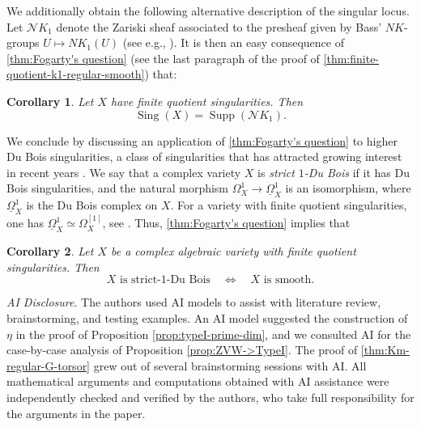 \documentclass{amsart}
\newtheorem{corollary}[corollary]{Corollary}
\theoremstyle{definition}
\newcommand{\cN}{\mathcal{N}}
\DeclareMathOperator{\Supp}{Supp}
\DeclareMathOperator{\Sing}{Sing}
\begin{document}
We additionally obtain the following alternative description of the singular locus. Let $\cN K_1$ denote the Zariski sheaf associated to the presheaf given by Bass' $NK$-groups $U\mapsto NK_1(U)$ (see e.g., \cite{vanderKallen86}). %
It is then an easy consequence of \autoref{thm:Fogarty's question} (see the last paragraph of the proof of \autoref{thm:finite-quotient-k1-regular-smooth}) that:

\begin{corollary}\label{cor:suppNK1}
    Let $X$ have finite quotient singularities. Then
    \[
        \Sing(X)=\Supp(\cN K_1).
    \]
\end{corollary}

We conclude by discussing an application of \autoref{thm:Fogarty's question} to higher Du Bois singularities, a class of singularities that has attracted growing interest in recent years \cite{MOPW, Jung2022, FL24a, FL24b, MP25, SVV, CDO26}. We say that a complex variety $X$ is \emph{strict $1$-Du Bois} if it has Du Bois singularities, and the natural morphism $\Omega_X^1\longrightarrow\underline{\Omega}_X^1$ is an isomorphism, where $\underline{\Omega}_X^1$ is the Du Bois complex on $X$. For a variety with finite quotient singularities, one has $\underline{\Omega}_X^1\simeq\Omega_X^{[1]}$, see \cite[Theorem 5.3]{DB81}. Thus, \autoref{thm:Fogarty's question} implies that 

\begin{corollary}
    Let $X$ be a complex algebraic variety with finite quotient singularities. Then
    \[
    X \text{ is strict-1-Du Bois}
    \quad\Longleftrightarrow\quad
    X \text{ is smooth}.
\]
\end{corollary}


\vspace{\medskipamount}



\noindent\emph{AI Disclosure}. 
The authors used AI models to assist with literature review, brainstorming, and testing examples. An AI model suggested the construction of $\eta$ in the proof of Proposition \ref{prop:typeI-prime-dim}, and we consulted AI for the case-by-case analysis of Proposition \ref{prop:ZVW->TypeI}. The proof of \autoref{thm:Km-regular-G-torsor} grew out of several brainstorming sessions with AI. All mathematical arguments and computations obtained with AI assistance were independently checked and verified by the authors, who take full responsibility for the arguments in the paper. 
\end{document}
